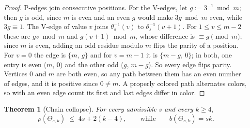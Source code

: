 \documentclass[11pt]{article}
\newtheorem{theorem}{Theorem}[section]
\theoremstyle{definition}
\newcommand{\inv}[1]{#1^{-1}}
\begin{document}
\begin{proof}
P-edges join consecutive positions. For the V-edges, let $g := 3^{-1} \bmod m$; then
$g$ is odd, since $m$ is even and an even $g$ would make $3g \bmod m$ even, while
$3g \equiv 1$. The V-edge of value $v$ joins $\inv{\theta_s}(v)$ to
$\inv{\theta_s}(v+1)$. For $1 \le v \le m-2$ these are $gv \bmod m$ and
$g(v+1) \bmod m$, whose difference is $\equiv g \pmod m$; since $m$ is even, adding an
odd residue modulo $m$ flips the parity of a position. For $v = 0$ the edge is
$\{m,\, g\}$ and for $v = m-1$ it is $\{m - g,\, 0\}$; in both, one entry is even
($m$, $0$) and the other odd ($g$, $m-g$). So every edge flips parity. Vertices $0$
and $m$ are both even, so any path between them has an even number of edges, and it is
positive since $0 \ne m$. A properly colored path alternates colors, so with an even
edge count its first and last edges differ in color.
\end{proof}

\begin{theorem}[Chain collapse]\label{thm:stairchain}
For every admissible $s$ and every $k \ge 4$,
\[
  \rho(\Theta_{s,k}) \;\le\; 4s + 2(k - 4),
  \qquad\text{while}\qquad b(\Theta_{s,k}) = sk .
\]
\end{theorem}
\end{document}
